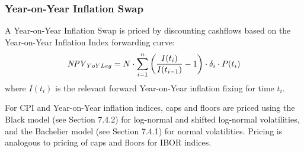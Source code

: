 \subsubsection{Year-on-Year Inflation Swap}
\label{pricing:inf_yyiis}

A Year-on-Year Inflation Swap is priced by discounting cashflows based on the 
Year-on-Year Inflation Index forwarding curve:
$$
\mathit{NPV}_{YoYLeg} = N\cdot \sum_{i=1}^n \left(\frac{I(t_i)}{I(t_{i-1})}-1\right) \cdot \delta_i\cdot P(t_i)
$$
where $I(t_i)$ is the relevant forward Year-on-Year inflation fixing for time 
$t_i$.

\medskip
For CPI and Year-on-Year inflation indices, caps and floors are priced using 
the Black model (see Section 7.4.2) for log-normal and shifted log-normal 
volatilities, and the Bachelier model (see Section 7.4.1) for normal 
volatilities. Pricing is analogous to pricing of caps and floors for IBOR indices.
